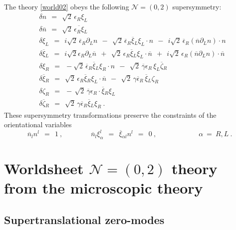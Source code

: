 \documentclass{article}
\newcommand{\p}{\partial}
\newcommand{\ov}{\overline}
\newcommand{\mc}[1]{\mathcal{#1}}
\newcommand{\bxir}{\ov{\xi}{}_R}
\newcommand{\bxil}{\ov{\xi}{}_L}
\newcommand{\xir}{\xi_R}
\newcommand{\xil}{\xi_L}
\newcommand{\bzr}{\ov{\zeta}{}_R}
\newcommand{\zr}{\zeta_R}
\begin{document}
	The theory \eqref{world02} obeys the following $ \mc{N}=(0,2) $ supersymmetry:
\begin{align*}
%
	&
	\delta n ~~=~~ \sqrt{2}\, \epsilon_R \xil  \\
%
	&
	 \delta\ov{n} ~~=~~ \sqrt{2}\, \ov{\epsilon_R \xi}{}_L
	\\
%
	&
	\delta\xil ~~=~~ i\sqrt{2}\, \ov{\epsilon}{}_R \p_L n ~~-~~ 
			\sqrt{2}\, \ov{\epsilon}{}_R \bxil\xil \cdot n ~~-~~
			i\sqrt{2}\, \ov{\epsilon}{}_R \left( \ov{n}\p_L n \right) \cdot n \\
%
	&
	\delta\bxil ~~=~~ i\sqrt{2}\epsilon_R \p_L \ov{n}  ~~+~~
			\sqrt{2}\,\epsilon_R \bxil\xil \cdot \ov{n} ~~+~~
			i\sqrt{2}\, \epsilon_R \left( \ov{n} \p_L n \right) \cdot \ov{n} \\
%
	& 
	\delta\xir ~~=~~ - \sqrt{2}\, \ov{\epsilon}{}_R \bxil\xir \cdot n 
		~~-~~ \sqrt{2}\, \ov{\gamma}\epsilon_R\, \xil \bzr \\
%
	&
	\delta\bxir  ~~=~~ \sqrt{2}\, \epsilon_R \bxir \xil \cdot \ov{n} 
		~~-~~ \sqrt{2}\, \gamma\ov{\epsilon}{}_R\, \bxil\zr \\
%
	&
	\delta\zeta_R ~~=~~ -\, \sqrt{2}\, \ov{\gamma}\epsilon_R \cdot \bxir\xil \\
%
	&
	\delta\ov{\zeta}{}_R ~~=~~ \sqrt{2}\, \gamma \ov{\epsilon}{}_R \bxil\xir~.
\end{align*}
	These supersymmetry transformations preserve the constraints of the orientational variables
\[
	\ov{n}{}_l n^l ~~=~~ 1~, \qquad\qquad  \ov{n}{}_l\xi_\alpha^l ~~=~~ \ov{\xi}{}_{\alpha l} n^l ~~=~~ 0~,
		\qquad\qquad\qquad  \alpha ~=~ R,L~.
\]

\section{Worldsheet $\mc{N}=(0,2)$ theory from the microscopic theory}

\subsection{Supertranslational zero-modes}
\newcommand{\loU}{\lambda_0^{\rm U(1)}}
\newcommand{\llU}{\lambda_1^{\rm U(1)}}
\newcommand{\loN}{\lambda_0^{\rm SU(N)}}
\newcommand{\llN}{\lambda_1^{\rm SU(N)}}
\newcommand{\poU}{\psi_0^{\rm U(1)}}
\newcommand{\plU}{\psi_1^{\rm U(1)}}
\newcommand{\poN}{\psi_0^{\rm SU(N)}}
\newcommand{\plN}{\psi_1^{\rm SU(N)}}
\end{document}
